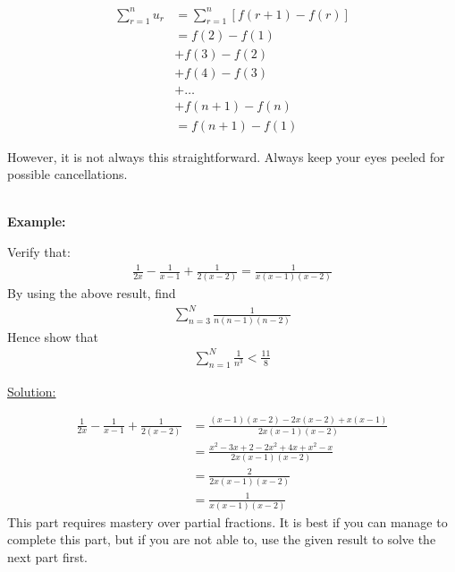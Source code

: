 \documentclass[12pt, a4paper, titlepage]{article}
\begin{document}
\begin{align*}
    \sum_{r = 1}^n u_r &= \sum_{r = 1}^n [f(r + 1) - f(r)] \\
    &= f(2) - f(1) \\
    &+ f(3) - f(2) \\
    &+ f(4) - f(3) \\
    &+ \dots \\
    &+ f(n + 1) - f(n) \\
    &= f(n + 1) - f(1)
\end{align*}

However, it is not always this straightforward. Always keep your eyes peeled for possible cancellations.

\textbf{\\ Example:}

Verify that:
\begin{align*}
    \frac{1}{2x} - \frac{1}{x - 1} + \frac{1}{2(x - 2)} = \frac{1}{x(x - 1)(x - 2)}
\end{align*}
By using the above result, find
\begin{align*}
    \sum^N_{n = 3} \frac{1}{n(n - 1)(n - 2)}
\end{align*}
Hence show that
\begin{align*}
    \sum^N_{n = 1} \frac{1}{n^3} < \frac{11}{8}
\end{align*}

\begin{flushright}
\end{flushright}

\underline{Solution:}

\begin{align*}
    \frac{1}{2x} - \frac{1}{x - 1} + \frac{1}{2(x - 2)} &= \frac{(x - 1)(x - 2) - 2x(x - 2) + x(x - 1)}{2x(x - 1)(x - 2)} \\
    &= \frac{x^2 - 3x + 2 - 2x^2 + 4x + x^2 - x}{2x(x - 1)(x - 2)} \\
    &= \frac{2}{2x(x - 1)(x - 2)} \\
    &= \frac{1}{x(x - 1)(x - 2)}
\end{align*}
This part requires mastery over partial fractions. It is best if you can manage to complete this part, but if you are not able to, use the given result to solve the next part first.
\end{document}
